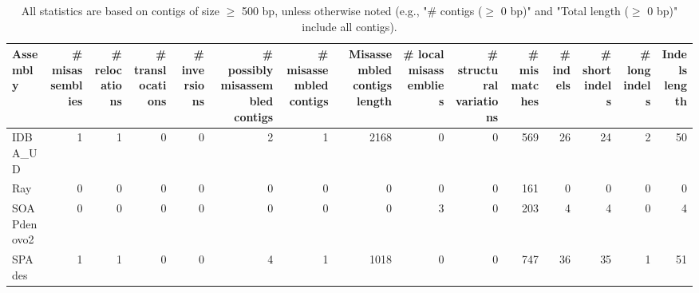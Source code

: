 \documentclass[12pt,a4paper]{article}
\begin{document}
\begin{table}[ht]
\begin{center}
\caption{All statistics are based on contigs of size $\geq$ 500 bp, unless otherwise noted (e.g., "\# contigs ($\geq$ 0 bp)" and "Total length ($\geq$ 0 bp)" include all contigs).}
\begin{tabular}{|l*{14}{|r}|}
\hline
Assembly & \# misassemblies &     \# relocations &     \# translocations &     \# inversions & \# possibly misassembled contigs & \# misassembled contigs & Misassembled contigs length & \# local misassemblies & \# structural variations & \# mismatches & \# indels &     \# short indels &     \# long indels & Indels length \\ \hline
IDBA\_UD & 1 & 1 & 0 & 0 & 2 & 1 & 2168 & 0 & 0 & 569 & 26 & 24 & 2 & 50 \\ \hline
Ray & 0 & 0 & 0 & 0 & 0 & 0 & 0 & 0 & 0 & 161 & 0 & 0 & 0 & 0 \\ \hline
SOAPdenovo2 & 0 & 0 & 0 & 0 & 0 & 0 & 0 & 3 & 0 & 203 & 4 & 4 & 0 & 4 \\ \hline
SPAdes & 1 & 1 & 0 & 0 & 4 & 1 & 1018 & 0 & 0 & 747 & 36 & 35 & 1 & 51 \\ \hline
\end{tabular}
\end{center}
\end{table}
\end{document}
